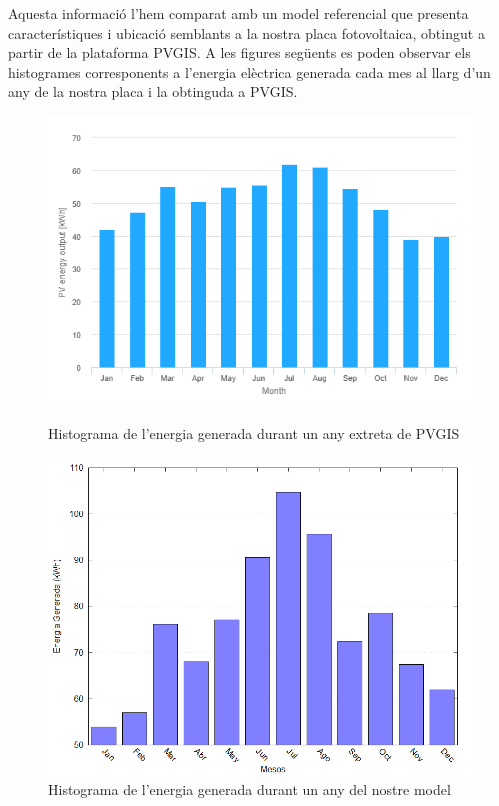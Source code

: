 \documentclass[10pt, twoside, a4paper]{article}
\begin{document}
Aquesta informació l'hem comparat amb un model referencial que presenta característiques i ubicació semblants a la nostra placa fotovoltaica, obtingut a partir de la plataforma PVGIS. A les figures següents es poden observar els histogrames corresponents a l'energia elèctrica generada cada mes al llarg d'un any de la nostra placa i la obtinguda a PVGIS. 
\begin{figure}[h!]
    \centering
    \begin{minipage}{0.45\linewidth} 
        \centering
        \includegraphics[width=\linewidth]{Histograma_PVGIS.png}
        \caption{Histograma de l'energia generada durant un any extreta de PVGIS}
        \label{fig:figura1}
    \end{minipage}\hfill 
    \begin{minipage}{0.45\linewidth} 
        \centering
        \includegraphics[width=\linewidth]{../Mov_sol/histograma.png}
        \caption{Histograma de l'energia generada durant un any del nostre model}
        \label{fig:figura2}
    \end{minipage}
\end{figure}
\end{document}
